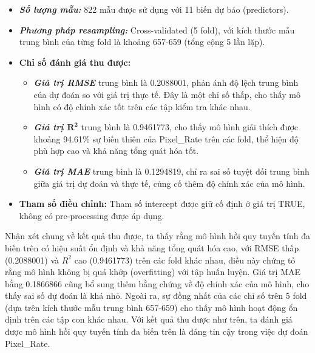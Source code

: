 \begin{itemize}
    \item \textbf{\textit{Số lượng mẫu:}} 822 mẫu được sử dụng với 11 biến dự báo (predictors).
    \item \textbf{\textit{Phương pháp resampling:}} Cross-validated (5 fold), với kích thước mẫu trung bình của từng fold là khoảng 657-659 (tổng cộng 5 lần lặp).
    \item \textbf{Chỉ số đánh giá thu được:}
    \begin{itemize}
    \item \textbf{\textit{Giá trị RMSE}} trung bình là 0.2088001, phản ánh độ lệch trung bình của dự đoán so với giá trị thực tế. Đây là một chỉ số thấp, cho thấy mô hình có độ chính xác tốt trên các tập kiểm tra khác nhau.
    \item \textbf{\textit{Giá trị $\mathbf{R^2}$}} trung bình là 0.9461773, cho thấy mô hình giải thích được khoảng 94.61\% sự biến thiên của Pixel\_Rate trên các fold, thể hiện độ phù hợp cao và khả năng tổng quát hóa tốt.
    \item \textbf{\textit{Giá trị MAE}} trung bình là 0.1294819, chỉ ra sai số tuyệt đối trung bình giữa giá trị dự đoán và thực tế, củng cố thêm độ chính xác của mô hình.
\end{itemize}
    \item \textbf{Tham số điều chỉnh:} Tham số intercept được giữ cố định ở giá trị TRUE, không có pre-processing được áp dụng.
\end{itemize}

Nhận xét chung về kết quả thu được, ta thấy rằng mô hình hồi quy tuyến tính đa biến trên có hiệu suất ổn định và khả năng tổng quát hóa cao, với RMSE thấp (0.2088001) và $R^2$ cao (0.9461773) trên các fold khác nhau, điều này chứng tỏ rằng mô hình không bị quá khớp (overfitting) với tập huấn luyện. Giá trị MAE bằng 0.1866866 cũng bổ sung thêm bằng chứng về độ chính xác của mô hình, cho thấy sai số dự đoán là khá nhỏ. Ngoài ra, sự đồng nhất của các chỉ số trên 5 fold (dựa trên kích thước mẫu trung bình 657-659) cho thấy mô hình hoạt động ổn định trên các tập con khác nhau. Với kết quả thu được như trên, ta đánh giá được mô hình hồi quy tuyến tính đa biến trên là đáng tin cậy trong việc dự đoán Pixel\_Rate.

